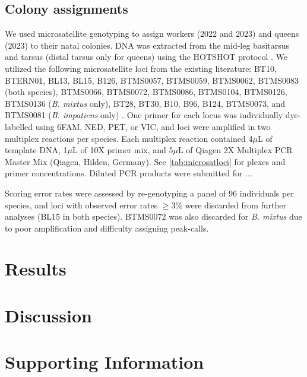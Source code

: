 \documentclass[12pt]{article}
\begin{document}
\subsection{Colony assignments}
We used microsatellite genotyping to assign workers (2022 and 2023) and queens (2023) to their natal colonies. DNA was extracted from the mid-leg basitarsus and tarsus (distal tarsus only for queens) using the HOTSHOT protocol \parencite{ INSERT TRUITT}. We utilized the following microsatellite loci from the existing literature: BT10, BTERN01, BL13, BL15, B126, BTMS0057, BTMS0059, BTMS0062, BTMS0083 (both species), BTMS0066, BTMS0072, BTMS0086, BTMS0104, BTMS0126, BTMS0136 (\textit{B. mixtus} only), BT28, BT30, B10, B96, B124, BTMS0073, and BTMS0081 (\textit{B. impatiens} only) \parencite{ CITE STOLLE, REBER-FUNK, ESTOUP--CHECK WHICH ESTOUP PAPERS!}. One primer for each locus was individually dye-labelled using 6FAM, NED, PET, or VIC, and loci were amplified in two multiplex reactions per species. Each multiplex reaction contained 4$\mu$L of template DNA, 1$\mu$L of 10X primer mix, and 5$\mu$L of Qiagen 2X Multiplex PCR Master Mix (Qiagen, Hilden, Germany). See \ref{tab:microsatloci} for plexes and primer concentrations. Diluted PCR products were submitted for ...

Scoring error rates were assessed by re-genotyping a panel of 96 individuals per species, and loci with observed error rates $\geq$3\% were discarded from further analyses (BL15 in both species). BTMS0072 was also discarded for \textit{B. mixtus} due to poor amplification and difficulty assigning peak-calls. 




\section{Results}
\section{Discussion}

\printbibliography
\clearpage




\section*{Supporting Information}

\setcounter{figure}{0}
\setcounter{table}{0}


%
\end{document}
